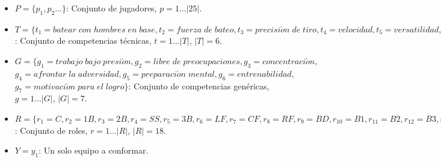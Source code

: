 \begin{table}[H]
	\centering
	\caption{Tipos de Roles}\label{tipo-roles}
\end{table}

\begin{itemize}	
	\item $P=\{p_1, p_2\ldots\}$: Conjunto de jugadores, $p = 1...|25|$.
	
	\item $T=\{t_1=batear\;con\;hombres\;en\;base, t_2=fuerza\;de\;bateo, t_3=precisi\acute{o}n\;de\;tiro, t_4=velocidad, t_5=versatilidad, t_6=capacidad\;de\;embase\}$: Conjunto de competencias técnicas, $t= 1\ldots|T|$, $|T|=6$. \label{compt-pel}
	
	\item $G=\{g_1=trabajo\;bajo\;presi\acute{o}n
	, g_2=libre\;de\;preocupaciones, g_3=concentraci\acute{o}n,$ $g_4=afrontar\;la\;adversidad, g_5=preparaci\acute{o}n\;mental, g_6=entrenabilidad,$ $g_7=motivaci\acute{o}n\;para\;el\;logro\}$: Conjunto de competencias genéricas, $g= 1\ldots |G|$, $|G|=7$.
	
	\item $R=\{r_1=C,r_2=1B,r_3=2B,r_4=SS,r_5=3B,r_6=LF,r_7=CF,r_8=RF,r_{9}=BD,r_{10}=B1,r_{11}=B2,r_{12}=B3,r_{13}=B4,r_{14}=B5,r_{15}=B6, r_{16}=B7,r_{17}=B8,r_{18}=B9\}$: Conjunto de roles, $r = 1\ldots |R|$, $|R|=18$. \label{def-roles-pel} 
	
	\item $Y={y_1}$: Un solo equipo a conformar.
	
\end{itemize}



